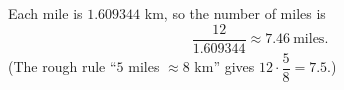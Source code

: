 Each mile is $1.609344$ km, so the number of miles is
\[
\dfrac{12}{1.609344}\approx\boxed{7.46}\ \text{miles}.
\]
(The rough rule ``$5$ miles $\approx8$ km'' gives $12\cdot\dfrac{5}{8}=7.5$.)

